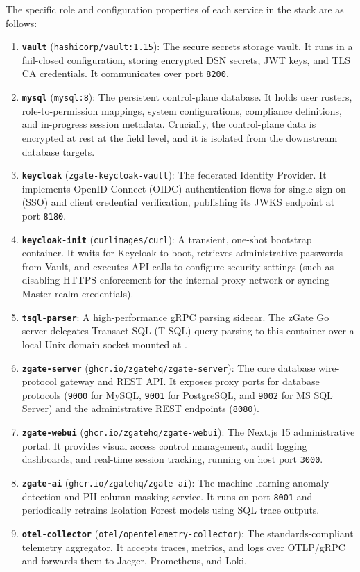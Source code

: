 The specific role and configuration properties of each service in the stack are as follows:
\begin{enumerate}
    \item \textbf{\texttt{vault}} (\texttt{hashicorp/vault:1.15}): The secure secrets storage vault. It runs in a fail-closed configuration, storing encrypted DSN secrets, JWT keys, and TLS CA credentials. It communicates over port \texttt{8200}.
    \item \textbf{\texttt{mysql}} (\texttt{mysql:8}): The persistent control-plane database. It holds user rosters, role-to-permission mappings, system configurations, compliance definitions, and in-progress session metadata. Crucially, the control-plane data is encrypted at rest at the field level, and it is isolated from the downstream database targets.
    \item \textbf{\texttt{keycloak}} (\texttt{zgate-keycloak-vault}): The federated Identity Provider. It implements OpenID Connect (OIDC) authentication flows for single sign-on (SSO) and client credential verification, publishing its JWKS endpoint at port \texttt{8180}.
    \item \textbf{\texttt{keycloak-init}} (\texttt{curlimages/curl}): A transient, one-shot bootstrap container. It waits for Keycloak to boot, retrieves administrative passwords from Vault, and executes API calls to configure security settings (such as disabling HTTPS enforcement for the internal proxy network or syncing Master realm credentials).
    \item \textbf{\texttt{tsql-parser}}: A high-performance gRPC parsing sidecar. The zGate Go server delegates Transact-SQL (T-SQL) query parsing to this container over a local Unix domain socket mounted at .
    \item \textbf{\texttt{zgate-server}} (\texttt{ghcr.io/zgatehq/zgate-server}): The core database wire-protocol gateway and REST API. It exposes proxy ports for database protocols (\texttt{9000} for MySQL, \texttt{9001} for PostgreSQL, and \texttt{9002} for MS SQL Server) and the administrative REST endpoints (\texttt{8080}).
    \item \textbf{\texttt{zgate-webui}} (\texttt{ghcr.io/zgatehq/zgate-webui}): The Next.js 15 administrative portal. It provides visual access control management, audit logging dashboards, and real-time session tracking, running on host port \texttt{3000}.
    \item \textbf{\texttt{zgate-ai}} (\texttt{ghcr.io/zgatehq/zgate-ai}): The machine-learning anomaly detection and PII column-masking service. It runs on port \texttt{8001} and periodically retrains Isolation Forest models using SQL trace outputs.
    \item \textbf{\texttt{otel-collector}} (\texttt{otel/opentelemetry-collector}): The standards-compliant telemetry aggregator. It accepts traces, metrics, and logs over OTLP/gRPC and forwards them to Jaeger, Prometheus, and Loki.
\end{enumerate}

